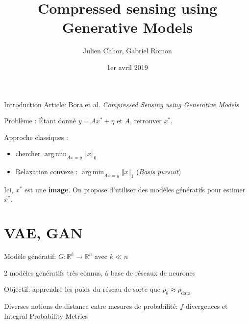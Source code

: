 \documentclass{beamer}
\title{Compressed sensing using Generative Models
}
\author{Julien Chhor, Gabriel Romon}
\date{1er avril 2019}
\DeclareMathOperator*{\data}{\text{data}}
\DeclareMathOperator*{\argmin}{arg\,min}
\newcommand{\norm}[1]{\left\Vert #1\right\Vert}
\begin{document}
\maketitle

\begin{frame}{Introduction}
    Article: Bora et al. \textit{Compressed Sensing using Generative Models}
    \vspace{2em}
    
    Problème : Étant donné $y = Ax^* + \eta$ et $A$, retrouver $x^*$.  
    
    \vspace{2em}

    Approche classiques : 
    
    \begin{itemize}
        \item chercher $\displaystyle \argmin_{Ax = y} \norm{x}_0 $
        \item Relaxation convexe : $\displaystyle \argmin_{Ax = y} \norm{x}_1 $ (\textit{Basis pursuit})
    \end{itemize}
    
    \vspace{2em}
    
    Ici, $x^*$ est une \textbf{image}. On propose d'utiliser des modèles génératifs pour estimer $x^*$.
    
\end{frame}

\begin{comment}
\begin{frame}{Sommaire}

\begin{enumerate}[label = \Roman*]
    \item VAE, GAN \vspace{2em}
    \item Résultats théoriques  \vspace{2em}
    \item Expériences  \vspace{2em}
\end{enumerate}
\end{frame}
\end{comment}


\section{VAE, GAN}

\begin{frame}{\secname}
Modèle génératif: $G:\mathbb R^k \to \mathbb R^n$ avec $k\ll n$
    \vspace{1em}
    
2 modèles génératifs très connus, à base de réseaux de neurones
    \vspace{1em}

Objectif: apprendre les poids du réseau de sorte que $p_{\theta} \approx p_{\data}$
    \vspace{1em}

Diverses notions de distance entre mesures de probabilité: $f$-divergences et Integral Probability Metrics

\end{frame}
\end{document}
